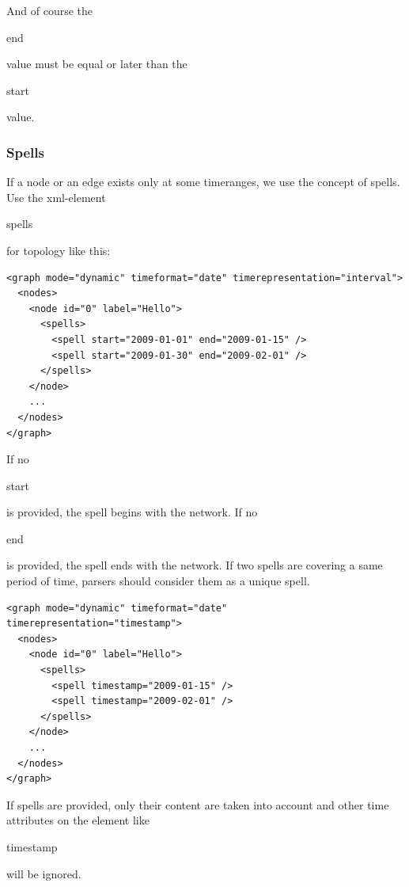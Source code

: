 \documentclass[a4paper,10pt]{article}
\begin{document}
And of course the \begin{footnotesize}end\end{footnotesize} value must be equal or later than the \begin{footnotesize}start\end{footnotesize} value.

\subsubsection{Spells}

If a node or an edge exists only at some timeranges, we use the concept of spells. Use the xml-element \begin{footnotesize}spells\end{footnotesize} for topology like this:

\lstset{ style=gexf }
\begin{lstlisting}[caption={Node with multiple spells (Intervals)}]
<graph mode="dynamic" timeformat="date" timerepresentation="interval">
  <nodes>
    <node id="0" label="Hello">
      <spells>
        <spell start="2009-01-01" end="2009-01-15" />
        <spell start="2009-01-30" end="2009-02-01" />
      </spells>
    </node>
    ...
  </nodes>
</graph>
\end{lstlisting}

If no \begin{footnotesize}start\end{footnotesize} is provided, the spell begins with the network. If no \begin{footnotesize}end\end{footnotesize} is provided, the spell ends with the network. If two spells are covering a same period of time, parsers should consider them as a unique spell.

\lstset{ style=gexf }
\begin{lstlisting}[caption={Node with multiple spells (Timestamps)}]
<graph mode="dynamic" timeformat="date" timerepresentation="timestamp">
  <nodes>
    <node id="0" label="Hello">
      <spells>
        <spell timestamp="2009-01-15" />
        <spell timestamp="2009-02-01" />
      </spells>
    </node>
    ...
  </nodes>
</graph>
\end{lstlisting}

If spells are provided, only their content are taken into account and other time attributes on the element like \begin{footnotesize}timestamp\end{footnotesize} will be ignored.
\end{document}

